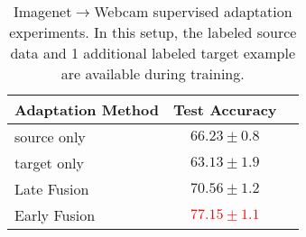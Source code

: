 \begin{table*}
\centering
\begin{tabular}{lcc}
\toprule
Adaptation Method & Test Accuracy \\
\midrule
source only  & $66.23 \pm 0.8$ \\
target only  & $63.13 \pm 1.9$ \\
\midrule
Late Fusion & $70.56 \pm 1.2$ \\
Early Fusion & \textcolor{red}{$\bm{77.15 \pm 1.1}$} \\
\bottomrule
\end{tabular}
\caption{Imagenet$\rightarrow$Webcam supervised adaptation experiments. In this setup, the labeled source data and 1 additional labeled
  target example are available during training.}
\label{tab:imagenet_fc8_sup}
\end{table*}
